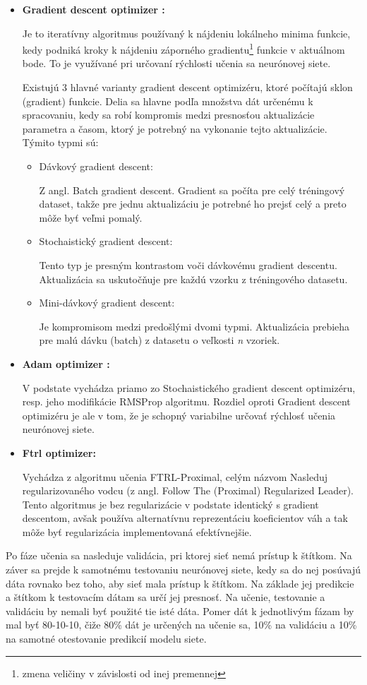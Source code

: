 \begin{itemize}
	\item \textbf{Gradient descent optimizer \cite{gradient_descent}:}
	
	Je to iteratívny algoritmus používaný k nájdeniu lokálneho minima funkcie, kedy podniká kroky k nájdeniu záporného gradientu\footnote{ zmena veličiny v závislosti od inej premennej} funkcie v aktuálnom bode. To je využívané pri určovaní rýchlosti učenia sa neurónovej siete. 
	
	Existujú 3 hlavné varianty gradient descent optimizéru, ktoré počítajú sklon (gradient) funkcie. Delia sa hlavne podľa množstva dát určenému k spracovaniu, kedy sa robí kompromis medzi presnosťou aktualizácie parametra a časom, ktorý je potrebný na vykonanie tejto aktualizácie. Týmito typmi sú:
	\begin{itemize}
		\item{Dávkový gradient descent:}
		
		Z angl. Batch gradient descent. Gradient sa počíta pre celý tréningový dataset, takže pre jednu aktualizáciu je potrebné ho prejsť celý a preto môže byť veľmi pomalý. 
		\item {Stochaistický gradient descent:}
		
		Tento typ je presným kontrastom voči dávkovému gradient descentu. Aktualizácia sa uskutočňuje pre každú vzorku z tréningového datasetu. 
		\item{Mini-dávkový gradient descent:}
		
		Je kompromisom medzi predošlými dvomi typmi. Aktualizácia prebieha pre malú dávku (batch) z datasetu o veľkosti \textit{n} vzoriek.
	\end{itemize} 
	\item \textbf{Adam optimizer \cite{adam}:}
	
	V podstate vychádza priamo zo Stochaistického gradient descent optimizéru, resp. jeho modifikácie RMSProp algoritmu\cite{rms}. Rozdiel oproti Gradient descent optimizéru je ale v tom, že je schopný variabilne určovať rýchlosť učenia neurónovej siete.
	
	\item \textbf{Ftrl optimizer:}
	
	Vychádza z algoritmu učenia FTRL-Proximal\cite{ftrl}, celým názvom Nasleduj regularizovaného vodcu (z angl. Follow The (Proximal) Regularized Leader). Tento algoritmus je bez regularizácie v podstate identický s gradient descentom, avšak používa alternatívnu reprezentáciu koeficientov váh a tak môže byť regularizácia implementovaná efektívnejšie.
\end{itemize}
Po fáze učenia sa nasleduje validácia, pri ktorej sieť nemá prístup k štítkom. Na záver sa prejde k samotnému testovaniu neurónovej siete, kedy sa do nej posúvajú dáta rovnako bez toho, aby sieť mala prístup k štítkom. Na základe jej predikcie a štítkom k testovacím dátam sa určí jej presnosť. Na učenie, testovanie a validáciu by nemali byť použité tie isté dáta. Pomer dát k jednotlivým fázam by mal byť 80-10-10\cite{80-10-10}, čiže 80\% dát je určených na učenie sa, 10\% na validáciu a 10\% na samotné otestovanie predikcií modelu siete. 

